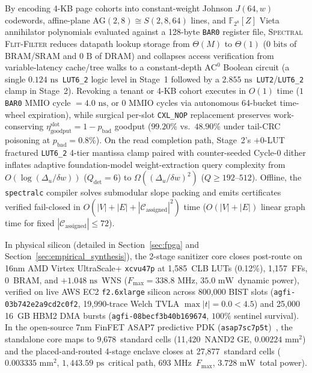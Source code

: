 \documentclass[10pt,twocolumn]{article}
\providecommand{\CoreClbLuts}{1,585}
\providecommand{\CoreFfs}{1,157}
\providecommand{\CoreWns}{\ensuremath{+1.048\text{~ns}}}
\providecommand{\StageOneNs}{\ensuremath{0.124\text{~ns}}}
\providecommand{\StageTwoNs}{\ensuremath{2.855\text{~ns}}}
\providecommand{\CoreFmax}{\ensuremath{338.8\text{~MHz}}}
\providecommand{\CorePowerMw}{\ensuremath{35.0\text{~mW}}}
\providecommand{\AwsAgfiId}{agfi-03b742e2a9cd2c0f2}
\providecommand{\AwsHbmAgfiId}{agfi-08becf3b40b169674}
\providecommand{\AwsLiveBursts}{25,000}
\providecommand{\AwsBistSlots}{800,000}
\providecommand{\AsicCoreCells}{9,678}
\providecommand{\AsicCoreGe}{11,420}
\providecommand{\AsicCoreAreaMm}{\ensuremath{0.00224\text{~mm}^2}}
\providecommand{\AsicStandardCells}{27,877}
\providecommand{\AsicEnclaveAreaMm}{\ensuremath{0.003335\text{~mm}^2}}
\providecommand{\AsicStageOneTwoDelayPs}{\ensuremath{1,443.59\text{~ps}}}
\providecommand{\AsicFmaxMhz}{\ensuremath{693\text{~MHz}}}
\providecommand{\AsicTotalPowerMw}{\ensuremath{3.728\text{~mW}}}
\providecommand{\CorePhysicalLUTs}{\CoreClbLuts}
\providecommand{\CoreLUTUtilPct}{0.12\%}
\providecommand{\CoreBRAM}{0}
\providecommand{\CoreTotalFFs}{\CoreFfs}
\providecommand{\PostRouteSetupWNS}{\CoreWns}
\providecommand{\StageOneSieveDelayNs}{\StageOneNs}
\providecommand{\StageTwoCriticalPathNs}{\StageTwoNs}
\providecommand{\PostRouteFmaxMHz}{\CoreFmax}
\providecommand{\PostRouteDynPowerMW}{\CorePowerMw}
\theoremstyle{spectralthm}
\begin{document}
By encoding 4-KB page cohorts into constant-weight Johnson $J(64,w)$ codewords, affine-plane $\mathrm{AG}(2,8) \cong S(2,8,64)$ lines, and $\mathbb{F}_{2^8}[Z]$ Vieta annihilator polynomials evaluated against a 128-byte \texttt{BAR0} register file, \textsc{Spectral Flit-Filter} reduces datapath lookup storage from $\Theta(M)$ to $\Theta(1)$ ($0\text{~bits}$ of BRAM/SRAM and $0\text{~B}$ of DRAM) and collapses access verification from variable-latency cache/tree walks to a constant-depth $\mathrm{AC}^0$ Boolean circuit (a single \StageOneSieveDelayNs\ \mbox{\texttt{LUT6\_2}} logic level in Stage~1 followed by a \StageTwoCriticalPathNs\ \texttt{LUT2}/\mbox{\texttt{LUT6\_2}} clamp in Stage~2). Revoking a tenant or 4-KB cohort executes in $O(1)$ time ($1$ \texttt{BAR0} MMIO cycle $= 4.0\text{~ns}$, or $0$ MMIO cycles via autonomous 64-bucket time-wheel expiration), while surgical per-slot \texttt{CXL\_NOP} replacement preserves work-conserving $\eta_{\mathrm{goodput}}^{\mathrm{slot}} = 1 - p_{\mathrm{bad}}$ goodput ($99.20\%$ vs.\ $48.90\%$ under tail-CRC poisoning at $p_{\mathrm{bad}} = 0.8\%$). On the read completion path, Stage~2's $+0$-LUT fractured \mbox{\texttt{LUT6\_2}} 4-tier mantissa clamp paired with counter-seeded Cycle-0 dither inflates adaptive foundation-model weight-extraction query complexity from $O(\log(\Delta_u/\delta w))$ ($Q_{\mathrm{det}} = 6$) to $\Omega((\Delta_u/\delta w)^2)$ ($Q \ge 192$--$512$). Offline, the \texttt{spectralc} compiler solves submodular slope packing and emits certificates verified fail-closed in $O(|V| + |E| + |\mathcal{C}_{\mathrm{assigned}}|^2)$ time ($O(|V| + |E|)$ linear graph time for fixed $|\mathcal{C}_{\mathrm{assigned}}| \le 72$).

In physical silicon (detailed in Section~\ref{sec:fpga} and Section~\ref{sec:empirical_synthesis}), the 2-stage sanitizer core closes post-route on 16nm AMD Virtex UltraScale+ \texttt{xcvu47p} at \CorePhysicalLUTs\ CLB LUTs (\CoreLUTUtilPct), \CoreTotalFFs\ FFs, \CoreBRAM\ BRAM, and \PostRouteSetupWNS\ WNS ($F_{\max} = \PostRouteFmaxMHz$, \PostRouteDynPowerMW\ dynamic power), verified on live AWS EC2 \texttt{f2.6xlarge} silicon across \AwsBistSlots{} BIST slots (\texttt{\AwsAgfiId}, 19,990-trace Welch TVLA $\max|t| = 0.0 < 4.5$) and \AwsLiveBursts{} 16~GB HBM2 DMA bursts (\texttt{\AwsHbmAgfiId}, $100\%$ sentinel survival). In the open-source 7nm FinFET ASAP7 predictive PDK (\texttt{asap7sc7p5t})~\cite{clark2016asap7}, the standalone core maps to \AsicCoreCells\ standard cells (\AsicCoreGe\ NAND2 GE, \AsicCoreAreaMm) and the placed-and-routed 4-stage enclave closes at \AsicStandardCells\ standard cells (\AsicEnclaveAreaMm, \AsicStageOneTwoDelayPs\ critical path, \AsicFmaxMhz\ $F_{\max}$, \AsicTotalPowerMw\ total power).
\end{document}
